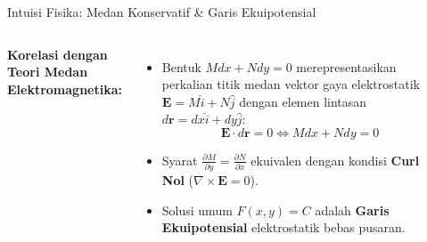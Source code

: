 \documentclass[aspectratio=169,10pt]{beamer}
\begin{document}
\begin{frame}{Intuisi Fisika: Medan Konservatif \& Garis Ekuipotensial}
  \begin{columns}[c]
    \textbf{Korelasi dengan Teori Medan Elektromagnetika:}
    \begin{itemize}
      \item Bentuk $M dx + N dy = 0$ merepresentasikan perkalian titik medan vektor gaya elektrostatik $\mathbf{E} = M \hat{i} + N \hat{j}$ dengan elemen lintasan $d\mathbf{r} = dx \hat{i} + dy \hat{j}$:
      \begin{equation*}
        \mathbf{E} \cdot d\mathbf{r} = 0 \iff M dx + N dy = 0
      \end{equation*}
      \item Syarat $\frac{\partial M}{\partial y} = \frac{\partial N}{\partial x}$ ekuivalen dengan kondisi \textbf{Curl Nol} ($\nabla \times \mathbf{E} = 0$).
      \item Solusi umum $F(x,y) = C$ adalah \textbf{Garis Ekuipotensial} elektrostatik bebas pusaran.
    \end{itemize}

    \begin{center}
    \end{center}
  \end{columns}
\end{frame}
\end{document}
